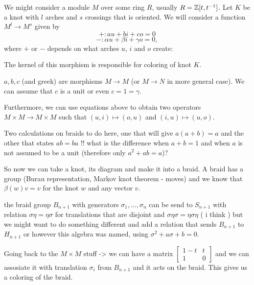 {\color{blue}
We might consider a module $M$ over some ring $R$, usually $R=\operatorname{\mathbb{Z}}[t, t^{-1}]$. Let $K$ be a knot with $l$ arches and $s$ crossings that is oriented. We will consider a function $M^{l}\to M^{s}$ given by
$$+: au+bi+co = 0$$
$$-: \alpha u+\beta i + \gamma o = 0,$$
where $+$ or $-$ depends on what arches $u$, $i$ and $o$ create:
\begin{center}
\end{center}
The kernel of this morphism is responsible for coloring of knot $K$. 

$a, b, c$ (and greek) are morphisms $M\to M$ (or $M\to N$ in more general case). We can assume that $c$ is a unit or even $c=1=\gamma$.

Furthermore, we can use equations above to obtain two operators $M\times M\to M\times M$ such that $(u,i)\mapsto (o, u)$ and $(i,u)\mapsto (u, o)$.

Two calculations on braids to do here, one that will give $a(a+b)=a$ and the other that states $ab=ba$ !! what is the difference when $a+b=1$ and when $a$ is not assumed to be a unit (therefore only $a^2+ab=a$)?

So now we can take a knot, its diagram and make it into a braid. A braid has a group (Burau representation, Markov knot theorem - moves) and we know that $\beta(w)v=v$ for the knot $w$ and any vector $v$.

the braid group $B_{n+1}$ with generators $\sigma_1, ..., \sigma_n$ can be send to $S_{n+1}$ with relation $\sigma\eta=\eta\sigma$ for translations that are disjoint and $\sigma\eta\sigma=\eta\sigma\eta$ ( i think ) but we might want to do something different and add a relation that sends $B_{n+1}$ to $H_{n+1}$ or however this algebra was named, using $\sigma^2+a\sigma+b=0$.

Going back to the $M\times M$ stuff -> we can have a matrix $\begin{bmatrix} 1-t & t\\ 1 & 0\end{bmatrix}$ and we can assosiate it with translation $\sigma_i$ from $B_{n+1}$ and it acts on the braid. This gives us a coloring of the braid.
}



